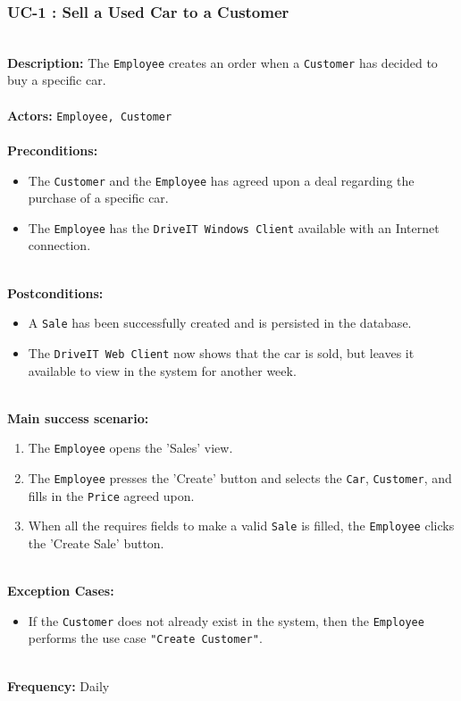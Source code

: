 \subsubsection{UC-1 : Sell a Used Car to a Customer}
\label{create-order-use-case}
\HRule \\[0.4cm]
\textbf{Description:} The \texttt{Employee} creates an order when a \texttt{Customer} has decided to buy a specific car. \\
\HRule \\[0.4cm]
\textbf{Actors:} \texttt{Employee, Customer}\\
\HRule \\[0.4cm]
\textbf{Preconditions:} 
\begin{itemize}
    \item The \texttt{Customer} and the \texttt{Employee} has agreed upon a deal regarding the purchase of a specific car.
    \item The \texttt{Employee} has the \texttt{DriveIT Windows Client} available with an Internet connection.
\end{itemize}
\HRule \\[0.4cm]
\textbf{Postconditions:}
\begin{itemize}
    \item A \texttt{Sale} has been successfully created and is persisted in the database.
    \item The \texttt{DriveIT Web Client} now shows that the car is sold, but leaves it available to view in the system for another week.
\end{itemize}
\HRule \\[0.4cm]
\textbf{Main success scenario:}
\begin{enumerate}
    \item The \texttt{Employee} opens the 'Sales' view.
   
    \item The \texttt{Employee} presses the 'Create' button and selects the \texttt{Car}, \texttt{Customer}, and fills in the \texttt{Price} agreed upon.
    \item When all the requires fields to make a valid \texttt{Sale} is filled, the \texttt{Employee} clicks the 'Create Sale' button.
\end{enumerate}
\HRule \\[0.4cm]
\textbf{Exception Cases:}
\begin{itemize}
	\item If the \texttt{Customer} does not already exist in the system, then the \texttt{Employee} performs the use case \texttt{"Create Customer"}.
\end{itemize}
\HRule \\[0.4cm]
\textbf{Frequency:}
Daily \\
\HRule \\[0.4cm]


